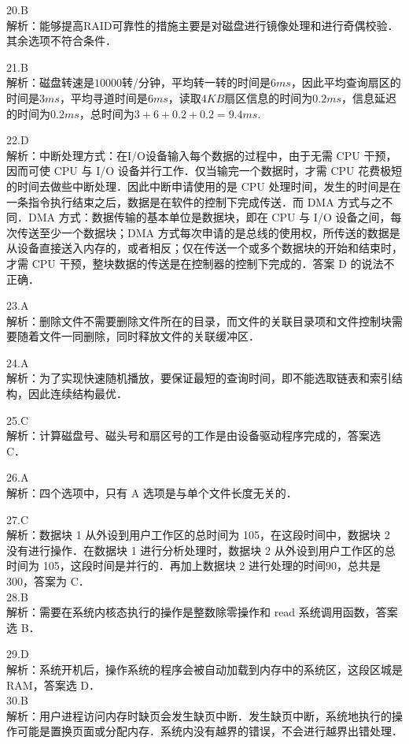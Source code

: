 20.B \\
解析：能够提高RAID可靠性的措施主要是对磁盘进行镜像处理和进行奇偶校验．其余选项不符合条件． 

21.B \\
解析：磁盘转速是$10 000$转/分钟，平均转一转的时间是$6ms$，因此平均查询扇区的时间是$3ms$，平均寻道时间是$6ms$，读取$4KB$扇区信息的时间为$0.2ms$，信息延迟的时间为$0.2ms$，总时间为$3+6+0.2+0.2=9.4ms$.

22.D \\
解析：中断处理方式：在I/O设备输入每个数据的过程中，由于无需 CPU 干预，因而可使 CPU 与 I/O 设备并行工作．仅当输完一个数据时，才需 CPU 花费极短的时间去做些中断处理．因此中断申请使用的是 CPU 处理时间，发生的时间是在一条指令执行结束之后，数据是在软件的控制下完成传送．而 DMA 方式与之不同．DMA 方式：数据传输的基本单位是数据块，即在 CPU 与 I/O 设备之间，每次传送至少一个数据块；DMA 方式每次申请的是总线的使用权，所传送的数据是从设备直接送入内存的，或者相反；仅在传送一个或多个数据块的开始和结束时，才需 CPU 干预，整块数据的传送是在控制器的控制下完成的．答案 D 的说法不正确． 

23.A \\
解析：删除文件不需要删除文件所在的目录，而文件的关联目录项和文件控制块需要随着文件一同删除，同时释放文件的关联缓冲区．

24.A \\
解析：为了实现快速随机播放，要保证最短的查询时间，即不能选取链表和索引结构，因此连续结构最优．

25.C \\
解析：计算磁盘号、磁头号和扇区号的工作是由设备驱动程序完成的，答案选 C．

26.A \\
解析：四个选项中，只有 A 选项是与单个文件长度无关的．

27.C \\
解析：数据块 1 从外设到用户工作区的总时间为 105，在这段时间中，数据块 2 没有进行操作．在数据块 1 进行分析处理时，数据块 2 从外设到用户工作区的总时间为 105，这段时间是并行的．再加上数据块 2 进行处理的时间90，总共是 300，答案为 C． \\

28.B \\
解析：需要在系统内核态执行的操作是整数除零操作和 read 系统调用函数，答案选 B．

29.D \\
解析：系统开机后，操作系统的程序会被自动加载到内存中的系统区，这段区城是 RAM，答案选 D． \\

30.B \\
解析：用户进程访问内存时缺页会发生缺页中断．发生缺页中断，系统地执行的操作可能是置换页面或分配内存．系统内没有越界的错误，不会进行越界出错处理． \\

